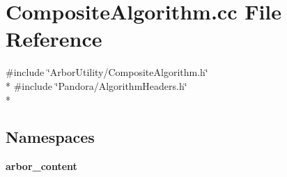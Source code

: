 \section{Composite\+Algorithm.\+cc File Reference}
\label{CompositeAlgorithm_8cc}
{\ttfamily \#include \char`\"{}Arbor\+Utility/\+Composite\+Algorithm.\+h\char`\"{}}\\*
{\ttfamily \#include \char`\"{}Pandora/\+Algorithm\+Headers.\+h\char`\"{}}\\*
\subsection*{Namespaces}
\begin{DoxyCompactItemize}
\item 
 {\bf arbor\+\_\+content}
\end{DoxyCompactItemize}
